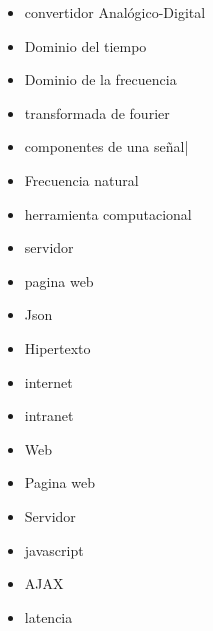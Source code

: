 \begin{itemize}
    \item convertidor Analógico-Digital
    \item Dominio del tiempo
    \item Dominio de la frecuencia
    \item transformada de fourier
    \item componentes de una señal|
    \item Frecuencia natural
    \item herramienta computacional
    \item servidor
    \item pagina web
    \item Json
    \item Hipertexto
    \item internet
    \item intranet
    \item Web
    \item Pagina web
    \item Servidor
    \item javascript
    \item AJAX
    \item latencia

\end{itemize}

